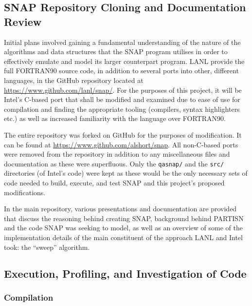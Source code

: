 \documentclass[conference]{IEEEtran}
\begin{document}
\subsection{SNAP Repository Cloning and Documentation Review}

Initial plans involved gaining a fundamental understanding of the nature of the algorithms and data structures that the SNAP program utilises in order to effectively emulate and model its larger counterpart program. LANL provide the full FORTRAN90 source code, in addition to several ports into other, different languages, in the GitHub repository located at \url{https://www.github.com/lanl/snap/}. For the purposes of this project, it will be Intel's C-based port that shall be modified and examined due to ease of use for compilation and finding the appropriate tooling (compilers, syntax highlighters etc.) as well as increased familiarity with the language over FORTRAN90.

The entire repository was forked on GitHub for the purposes of modification. It can be found at \url{https://www.github.com/alshort/snap}. All non-C-based ports were removed from the repository in addition to any miscellaneous files and documentation as these were superfluous. Only the \texttt{qasnap/} and the \texttt{src/} directories (of Intel's code) were kept as these would be the only necessary sets of code needed to build, execute, and test SNAP and this project's proposed modifications.

In the main repository, various presentations and documentation are provided that discuss the reasoning behind creating SNAP, background behind PARTISN and the code SNAP was seeking to model, as well as an overview of some of the implementation details of the main constituent of the approach LANL and Intel took: the ``sweep'' algorithm.

\subsection{Execution, Profiling, and Investigation of Code}

\subsubsection{Compilation}
\end{document}
